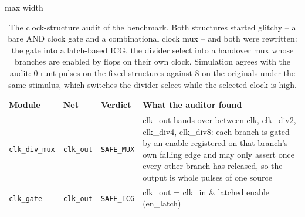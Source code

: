 \begin{table}[htbp]
  \centering
  \footnotesize
  \caption{The clock-structure audit of the benchmark. Both structures started glitchy -- a bare AND clock gate and a combinational clock mux -- and both were rewritten: the gate into a latch-based ICG, the divider select into a handover mux whose branches are enabled by flops on their own clock. Simulation agrees with the audit: 0 runt pulses on the fixed structures against 8 on the originals under the same stimulus, which switches the divider select while the selected clock is high.}
  \label{tab:clockrisk}
  \begin{adjustbox}{max width=\textwidth}
  \begin{tabular}{lllp{62mm}}
    \toprule
    \textbf{Module} & \textbf{Net} & \textbf{Verdict} & \textbf{What the auditor found} \\
    \midrule
    \texttt{clk\_div\_mux} & \texttt{clk\_out} & \texttt{SAFE\_MUX} & clk\_out hands over between clk, clk\_div2, clk\_div4, clk\_div8: each branch is gated by an enable registered on that branch's own falling edge and may only assert once every other branch has released, so the output is whole pulses of one source \\
    \texttt{clk\_gate} & \texttt{clk\_out} & \texttt{SAFE\_ICG} & clk\_out = clk\_in \& latched enable (en\_latch) \\
    \bottomrule
  \end{tabular}
  \end{adjustbox}
\end{table}
